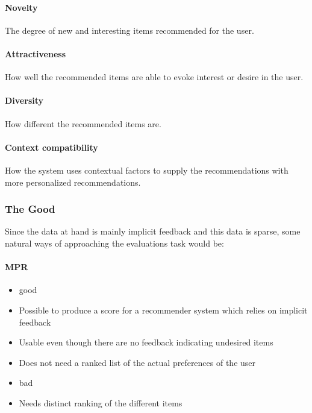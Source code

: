 \paragraph{Novelty}
The degree of new and interesting items recommended for the user.

\paragraph{Attractiveness}
How well the recommended items are able to evoke interest or desire in the user.

\paragraph{Diversity}
How different the recommended items are.

\paragraph{Context compatibility}
How the system uses contextual factors to supply the recommendations with more personalized recommendations.


\subsubsection{The Good}
Since the data at hand is mainly implicit feedback and this data is sparse, some natural ways of approaching the evaluations task would be:

\paragraph{MPR}
\begin{itemize}
	\item good
	\item Possible to produce a score for a recommender system which relies on implicit feedback
	\item Usable even though there are no feedback indicating undesired items
	\item Does not need a ranked list of the actual preferences of the user
	\item bad
	\item Needs distinct ranking of the different items
\end{itemize}

